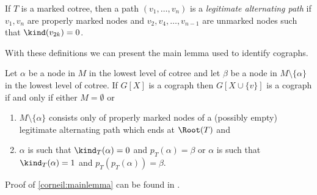 \begin{defi}
    If $T$ is a marked cotree, then a path $(v_1, \ldots, v_n)$ is a \emph{legitimate alternating path} if $v_1, v_n$ are properly marked nodes and $v_2, v_4, \ldots, v_{n-1}$ are unmarked nodes such that $\kind(v_{2k}) = 0$.
\end{defi}

With these definitions we can present the main lemma used to identify cographs.

\begin{lemma}
    \label{corneil:mainlemma}
    Let $\alpha$ be a node in $M$ in the lowest level of cotree and let $\beta$ be a node in $M \setminus \{\alpha\}$ in the lowest level of cotree. If $G[X]$ is a cograph then $G[X \cup \{v\}]$ is a cograph if and only if either $M = \emptyset$ or
    \begin{enumerate}
        \item $M \setminus \{\alpha\}$ consists only of properly marked nodes of a (possibly empty) legitimate alternating path which ends at $\Root(T)$ and
        \item $\alpha$ is such that $\kind_T(\alpha) = 0$ and $p_T(\alpha) = \beta$ or $\alpha$ is such that $\kind_T(\alpha) = 1$ and $p_T(p_T(\alpha)) = \beta$.
    \end{enumerate}
\end{lemma}

Proof of \ref{corneil:mainlemma} can be found in \cite{corneil}.